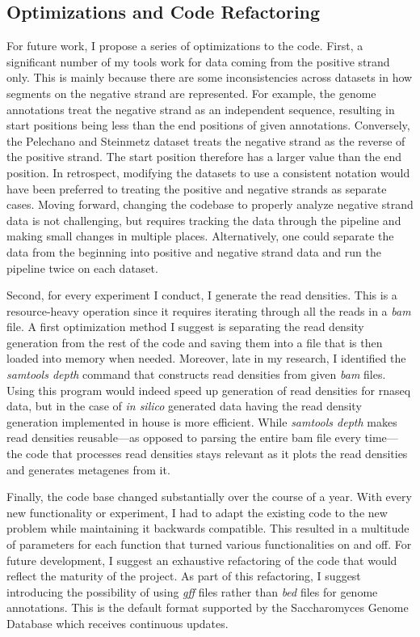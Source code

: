 \documentclass[12pt]{article}
\begin{document}
\subsection{Optimizations and Code Refactoring}

For future work, I propose a series of optimizations to the code. First, a significant number of my tools work for data coming from the positive strand only. This is mainly because there are some inconsistencies across datasets in how segments on the negative strand are represented. For example, the genome annotations treat the negative strand as an independent sequence, resulting in start positions being less than the end positions of given annotations. Conversely, the Pelechano and Steinmetz \cite{Pelechano2013} dataset treats the negative strand as the reverse of the positive strand. The start position therefore has a larger value than the end position. In retrospect, modifying the datasets to use a consistent notation would have been preferred to treating the positive and negative strands as separate cases. Moving forward, changing the codebase to properly analyze negative strand data is not challenging, but requires tracking the data through the pipeline and making small changes in multiple places. Alternatively, one could separate the data  from the beginning into positive and negative strand data and run the pipeline twice on each dataset.

Second, for every experiment I conduct, I generate the read densities. This is a resource-heavy operation since it requires iterating through all the reads in a \textit{bam} file. A first optimization method I suggest is separating the read density generation from the rest of the code and saving them into a file that is then loaded into memory when needed. Moreover, late in my research, I identified the \textit{samtools depth } command that constructs read densities from given \textit{bam} files. Using this program would indeed speed up generation of read densities for \acrshort{rnaseq} data, but in the case of \textit{in silico} generated data having the read density generation implemented in house is more efficient. While \textit{samtools depth} makes read densities reusable---as opposed to parsing the entire bam file every time---the code that processes read densities stays relevant as it plots the read densities and generates metagenes from it. 

Finally, the code base changed substantially over the course of a year. With every new functionality or experiment, I had to adapt the existing code to the new problem while maintaining it backwards compatible. This resulted in a multitude of parameters for each function that turned various functionalities on and off. For future development, I suggest an exhaustive refactoring of the code that would reflect the maturity of the project. As part of this refactoring, I suggest introducing the possibility of using \textit{gff} files rather than \textit{bed} files for genome annotations. This is the default format supported by the Saccharomyces Genome Database which receives continuous updates. 
\end{document}
